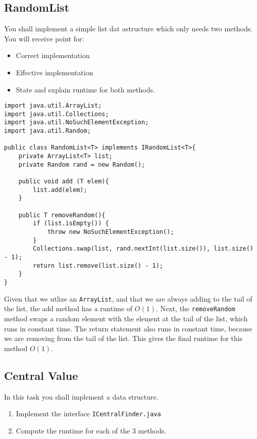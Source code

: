 \documentclass{article}
\begin{document}
    \subsection{RandomList}
    You shall implement a simple list dat astructure which only needs two methods. You will receive point for:
    
    \begin{itemize}
        \item Correct implementation
        \item Effective implementation
        \item State and explain runtime for both methods.
    \end{itemize}

    \begin{ans}
        \hspace{1em}
    \begin{lstlisting}
import java.util.ArrayList;
import java.util.Collections;
import java.util.NoSuchElementException;
import java.util.Random;

public class RandomList<T> implements IRandomList<T>{
    private ArrayList<T> list;
    private Random rand = new Random();

    public void add (T elem){
        list.add(elem);
    }

    public T removeRandom(){
        if (list.isEmpty()) {
            throw new NoSuchElementException();
        }
        Collections.swap(list, rand.nextInt(list.size()), list.size() - 1);
        return list.remove(list.size() - 1);
    }
} 
    \end{lstlisting}

    Given that we utlize an \texttt{ArrayList}, and that we are always adding to the tail of the list, the add method has a runtime of \( O\left( 1 \right) \). Next, the \texttt{removeRandom} method swaps a random element with the element at the tail of the list, which runs in constant time. The return statement also runs in constant time, because we are removing from the tail of the list. This gives the final runtime for this method \( O\left( 1 \right) \).
    \end{ans}

    \subsection{Central Value}
    In this task you shall implement a data structure.

    \begin{enumerate}
        \item Implement the interface \texttt{ICentralFinder.java}
        \item Compute the runtime for each of the 3 methods.
    \end{enumerate}
\end{document}
